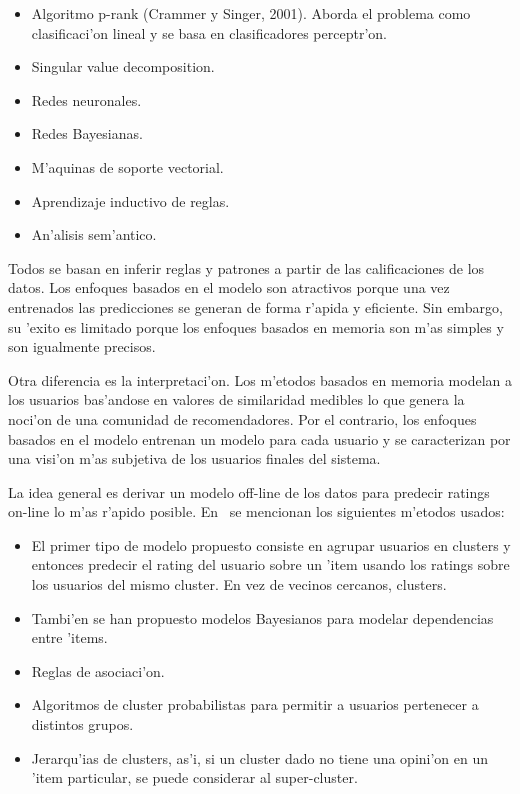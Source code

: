 \documentclass[11pt]{article}
\begin{document}
\begin{itemize}
\item Algoritmo p-rank (Crammer y Singer, 2001). Aborda el problema como clasificaci'on lineal y se basa en clasificadores perceptr'on.
\item Singular value decomposition.
\item Redes neuronales.
\item Redes Bayesianas.
\item M'aquinas de soporte vectorial.
\item Aprendizaje inductivo de reglas.
\item An'alisis sem'antico. 
\end{itemize}

Todos se basan en inferir reglas y patrones a partir de las calificaciones de los datos. Los enfoques basados en el modelo son atractivos porque una vez entrenados las predicciones se generan de forma r'apida y eficiente. Sin embargo, su 'exito es limitado porque los enfoques basados en memoria son m'as simples y son igualmente precisos.

Otra diferencia es la interpretaci'on. Los m'etodos basados en memoria modelan a los usuarios bas'andose en valores de similaridad medibles lo que genera la noci'on de una comunidad de recomendadores. Por el contrario, los enfoques basados en el modelo entrenan un modelo para cada usuario y se caracterizan por una visi'on m'as subjetiva de los usuarios finales del sistema.

La idea general es derivar un modelo off-line de los datos para predecir ratings on-line lo m'as r'apido posible. En~\cite{start:candillier09} se mencionan los siguientes m'etodos usados:

\begin{itemize}
\item El primer tipo de modelo propuesto consiste en agrupar usuarios en clusters y entonces predecir el rating del usuario sobre un 'item usando los ratings sobre los usuarios del mismo cluster. En vez de vecinos cercanos, clusters.
\item Tambi'en se han propuesto modelos Bayesianos para modelar dependencias entre 'items.
\item Reglas de asociaci'on.
\item Algoritmos de cluster probabilistas para permitir a usuarios pertenecer a distintos grupos.
\item Jerarqu'ias de clusters, as'i, si un cluster dado no tiene una opini'on en un 'item particular, se puede considerar al super-cluster.
\end{itemize}
\end{document}
